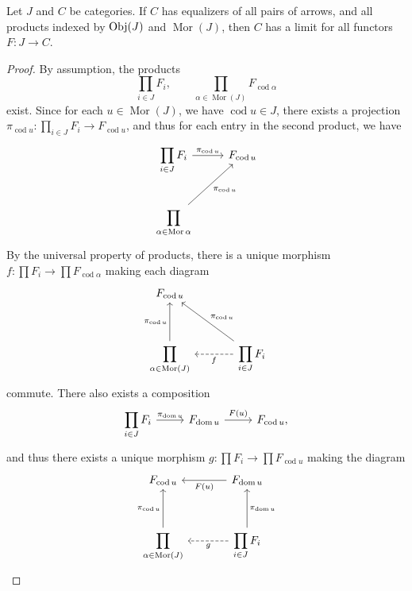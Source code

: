 \begin{theorem}\label{thm:5.3}
	Let $J$ and $C$ be categories. If $C$ has equalizers of all pairs of arrows, and all products indexed by $\operatorname{Obj}(J) $ and $\operatorname{Mor} (J)$, then $C$ has a limit for all functors $F : J \to C$.
\end{theorem}
\begin{proof}
	By assumption, the products
	\[
		\prod_{i\in J} F_i,\qquad \prod_{\alpha \in \operatorname{Mor} (J)} F_{\operatorname{cod} \alpha } 
	\]
	exist. Since for each $u\in \operatorname{Mor} (J)$, we have $\operatorname{cod} u\in J$, there exists a projection $\pi_{\operatorname{cod} u} : \prod_{i\in J} F_i \to F_{\operatorname{cod} u} $, and thus for each entry in the second product, we have
	\[\begin{tikzcd}[row sep = 2.5em, column sep = 2.5em]
		\displaystyle{\prod_{i\in J} F_i }\ar[" \pi_{\operatorname{cod} u}  ", r]  & F_{\operatorname{cod} u}  \\
\displaystyle{\prod_{\alpha \in \operatorname{Mor} \alpha } } \ar[" \pi_{\operatorname{cod} u}  "', ur] & 
	\end{tikzcd}\]
	By the universal property of products, there is a unique morphism $f : \prod F_i \to \prod F_{\operatorname{cod} \alpha } $ making each diagram
	\[\begin{tikzcd}[row sep = 3.5em, column sep = 3.5em]
	F_{\operatorname{cod} u} &  \\
	\displaystyle{\prod_{\alpha \in \operatorname{Mor} (J)} }\ar[" \pi_{\operatorname{cod} u}  ", u]  & \displaystyle{\prod_{i\in J} F_i} \ar[" \pi_{\operatorname{cod} u}  "', ul]  \ar[" f ", dashed, l]
	\end{tikzcd}\]
	commute. There also exists a composition
	\[\begin{tikzcd}[row sep = 2.5em, column sep = 2.5em]
		\displaystyle{\prod_{i\in J}F_i}\ar[" \pi_{\operatorname{dom} u}  ", r]   & F_{\operatorname{dom} u} \ar[" F(u) ", r]  & F_{\operatorname{cod} u} ,
	\end{tikzcd}\]
	and thus there exists a unique morphism $g : \prod F_i \to \prod F_{\operatorname{cod} u} $ making the diagram
	\[\begin{tikzcd}[row sep = 3.5em, column sep = 3.5em]
	F_{\operatorname{cod} u} & F_{\operatorname{dom} u} \ar[" F(u) ", l]  \\
	\displaystyle{\prod_{\alpha \in \operatorname{Mor} (J)} }\ar[" \pi_{\operatorname{cod} u}  ", u]  & \displaystyle{\prod_{i\in J} F_i} \ar[" \pi_{\operatorname{dom} u}  "', u]  \ar[" g ", dashed, l]

\end{tikzcd}\]
\end{proof}
